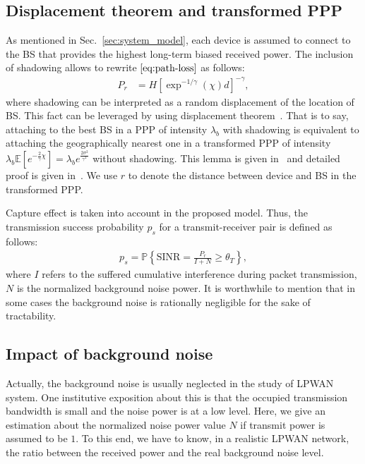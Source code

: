 \subsection{Displacement theorem and transformed PPP}
\label{subsec:displacement_theorem}
As mentioned in Sec.~\ref{sec:system_model}, each device is assumed to connect to the BS that provides the highest long-term biased received power. The inclusion of shadowing allows to rewrite $\eqref{eq:path-loss}$ as follows:
\begin{align}
P_{r} 
&= H \left[  \exp^{-1/\gamma}(\chi) d \right]  ^ {-\gamma},
\end{align}
where shadowing can be interpreted as a random displacement of the location of BS. This fact can be leveraged by using displacement theorem~\cite{franccois2009stochastic}. That is to say, attaching to the best BS in a PPP of intensity $\lambda_{b}$ with shadowing is equivalent to attaching the geographically nearest one in a transformed PPP of intensity $\lambda_{b} \mathbb{E}\left[ e^{-\frac{2}{\gamma}\chi}\right] = \lambda_{b} e^{\frac{2\sigma^2}{\gamma^2}}$ without shadowing. This lemma is given in~\cite[lemma 1]{dhillon2014downlink} and detailed proof is given in~\cite[Corollary 3]{madhusudhanan2014downlink}. We use $r$ to denote the distance between device and BS in the transformed PPP.

Capture effect is taken into account in the proposed model. Thus, the transmission success probability $p_{s}$ for a transmit-receiver pair is defined as follows: 
\begin{align}
\label{eq: sinr-definition}
p_s = \mathbb{P}\left\lbrace  \text{SINR} = \frac{P_r}{I + N} \geq \theta_{T} \right\rbrace, 
\end{align}
where $I$ refers to the suffered cumulative interference during packet transmission, $N$ is the normalized background noise power. It is worthwhile to mention that in some cases the background noise is rationally negligible for the sake of tractability.

\subsection{Impact of background noise}
Actually, the background noise is usually neglected in the study of LPWAN system. One institutive exposition about this is that the occupied transmission bandwidth is small and the noise power is at a low level. Here, we give an estimation about the normalized noise power value $N$ if transmit power is assumed to be $1$. To this end, we have to know, in a realistic LPWAN network, the ratio between the received power and the real background noise level.

